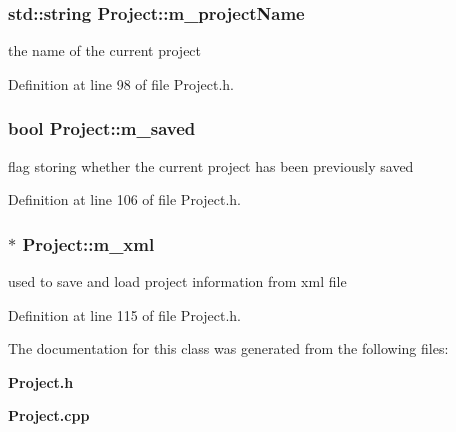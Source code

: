 \subsubsection[{m\-\_\-project\-Name}]{\setlength{\rightskip}{0pt plus 5cm}std\-::string Project\-::m\-\_\-project\-Name\hspace{0.3cm}{\ttfamily [private]}}\label{class_project_ac07cb04143a5541e4ea37cdc6269f826}


the name of the current project 



Definition at line 98 of file Project.\-h.

\subsubsection[{m\-\_\-saved}]{\setlength{\rightskip}{0pt plus 5cm}bool Project\-::m\-\_\-saved\hspace{0.3cm}{\ttfamily [private]}}\label{class_project_a535613b06e2e019be57ca5d8bb335e7d}


flag storing whether the current project has been previously saved 



Definition at line 106 of file Project.\-h.

\subsubsection[{m\-\_\-xml}]{$\ast$ Project\-::m\-\_\-xml\hspace{0.3cm}{\ttfamily [private]}}\label{class_project_a6c567e3ef8fee5be922143d0a7348b48}


used to save and load project information from xml file 



Definition at line 115 of file Project.\-h.



The documentation for this class was generated from the following files\-:\begin{DoxyCompactItemize}
\item 
{\bf Project.\-h}\item 
{\bf Project.\-cpp}\end{DoxyCompactItemize}
